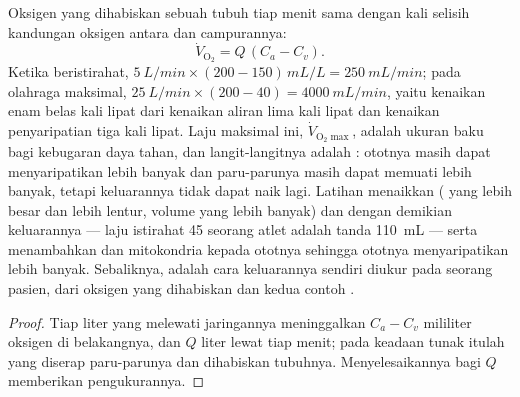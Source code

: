\begin{theorem}\label{thm:b2:blood-pressure:fick}
Oksigen yang dihabiskan sebuah tubuh tiap menit sama dengan  kali selisih kandungan oksigen antara   dan 
 campurannya:
\[
\dot V_{\mathrm{O_2}} = Q\,(C_a - C_v).
\]
Ketika beristirahat, $\qty{5}{L/min}\times(200 - 150)\,\unit{mL/L} = \qty{250}{mL/min}$;
pada olahraga maksimal, $\qty{25}{L/min}\times(200 - 40) =
\qty{4000}{mL/min}$, yaitu kenaikan enam belas kali lipat dari kenaikan
aliran lima kali lipat dan kenaikan penyaripatian tiga kali lipat. Laju
maksimal ini, $\dot V_{\mathrm{O_2}\max}$, adalah ukuran baku bagi
kebugaran daya tahan, dan langit-langitnya adalah : ototnya
masih dapat menyaripatikan lebih banyak dan paru-parunya masih dapat
memuati lebih banyak, tetapi keluarannya tidak dapat naik lagi.
Latihan menaikkan  ( yang lebih besar dan lebih
lentur, volume  yang lebih banyak) dan dengan demikian
keluarannya --- laju istirahat 45 seorang atlet adalah tanda  \qty{110}{mL} --- serta menambahkan  dan mitokondria
kepada ototnya sehingga ototnya menyaripatikan lebih banyak.
Sebaliknya,  adalah cara keluarannya sendiri diukur pada
seorang pasien, dari oksigen yang dihabiskan dan kedua contoh .
\end{theorem}
\begin{proof}
Tiap liter  yang melewati jaringannya meninggalkan $C_a - C_v$
mililiter oksigen di belakangnya, dan $Q$ liter lewat tiap menit; pada
keadaan tunak itulah yang diserap paru-parunya dan dihabiskan tubuhnya.
Menyelesaikannya bagi $Q$ memberikan pengukurannya.
\end{proof}

